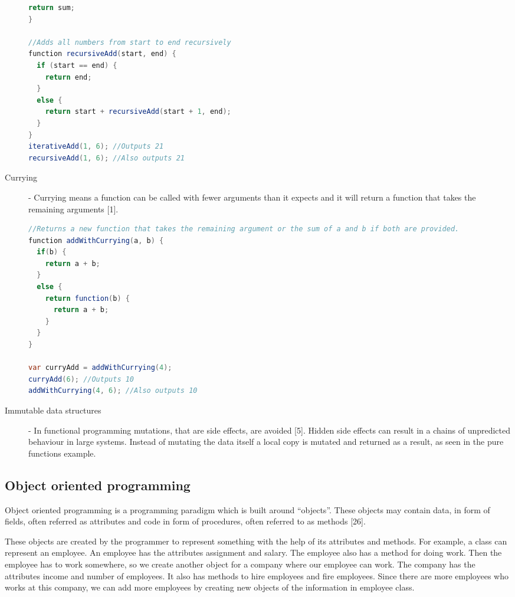 \documentclass {article}
\begin{document}
\begin{description}
\begin{lstlisting}[language=Java]
  return sum;
}

//Adds all numbers from start to end recursively
function recursiveAdd(start, end) {
  if (start == end) {
    return end;
  }
  else {
    return start + recursiveAdd(start + 1, end);
  }
}
iterativeAdd(1, 6); //Outputs 21
recursiveAdd(1, 6); //Also outputs 21
\end{lstlisting}

\item [Currying] - Currying means a function can be called with fewer arguments than it expects and it will return a function that takes the remaining arguments [1]. 

\begin{lstlisting}[language=Java, breaklines=true]
//Returns a new function that takes the remaining argument or the sum of a and b if both are provided.
function addWithCurrying(a, b) {
  if(b) {
    return a + b;
  }
  else {
    return function(b) {
      return a + b;
    }
  }
}

var curryAdd = addWithCurrying(4); 
curryAdd(6); //Outputs 10
addWithCurrying(4, 6); //Also outputs 10
\end{lstlisting}

\item [Immutable data structures] - In functional programming mutations, that are side effects, are avoided [5]. Hidden side effects can result in a chains of unpredicted behaviour in large systems. Instead of mutating the data itself a local copy is mutated and returned as a result, as seen in the pure functions example.
\end{description}
\subsection{Object oriented programming}
Object oriented programming is a programming paradigm which is built around “objects”. These objects may contain data, in form of fields, often referred as attributes and code in form of procedures, often referred to as methods [26].

These objects are created by the programmer to represent something with the help of its attributes and methods. For example, a class can represent an employee. An employee has the attributes assignment and salary. The employee also has a method for doing work. Then the employee has to work somewhere, so we create another object for a company where our employee can work. The company has the attributes income and number of employees. It also has methods to hire employees and fire employees. Since there are more employees who works at this company, we can add more employees by creating new objects of the information in employee class.
\end{document}
